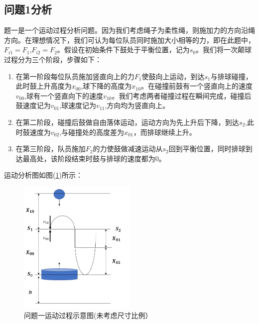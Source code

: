 \documentclass{cumcm}
\begin{document}
\subsection{问题1分析}
题一是一个运动过程分析问题。因为我们考虑绳子为柔性绳，则施加力的方向沿绳方向。在理想情况下，我们可认为每位队员同时施加大小相等的力，即在此题中，$F_{i1}=F_1$,$F_{i2}=F_2$。假设在初始条件下鼓处于平衡位置，记为$s_0$。我们将一次颠球过程分为三个阶段，步骤如下：
\begin{enumerate}
\item 在第一阶段每位队员施加竖直向上的力$F_1$使鼓向上运动，到达$s_1$与排球碰撞，此时鼓上升高度为$x_{00}$,球下降的高度为$x_{10}$。在碰撞前鼓有一个竖直向上的速度$v_{00}$,球有一个竖直向下的速度$v_{10}$。我们考虑两者碰撞过程在瞬间完成，碰撞后鼓速度记为$v_{01}$,球速度记为$v_{11}$,方向均为竖直向上。
\item 在第二阶段，碰撞后鼓做自由落体运动，运动方向为先上升后下降，到达$s_2$,此时鼓速度为$v_{02}$,与碰撞处的高度差为$x_{01}$，而排球继续上升。
\item 在第三阶段，队员施加$F_2$的力使鼓做减速运动从$s_2$回到平衡位置，同时排球到达最高处，该阶段结束时鼓与排球的速度都为$0$。
\end{enumerate}
运动分析图如图(\ref{fig-buoy})所示：
\begin{figure}[H]
\centering
\includegraphics[width=0.5\textwidth]{img/question1.png}
\caption{问题一运动过程示意图(未考虑尺寸比例）}\label{fig-buoy}
\end{figure}
\end{document}
